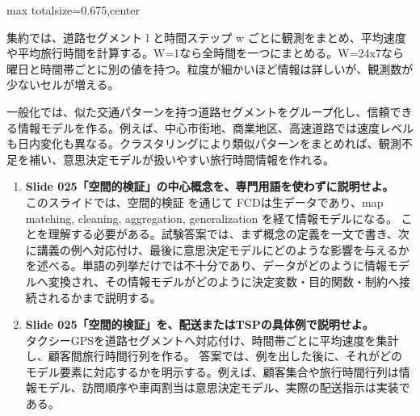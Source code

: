 \begin{adjustbox}{max totalsize={\textwidth}{0.675\textheight},center}
\begin{minipage}{\textwidth}
\begin{minipage}[t]{0.485\textwidth}
集約では、道路セグメント l と時間ステップ w ごとに観測をまとめ、平均速度や平均旅行時間を計算する。W=1なら全時間を一つにまとめる。W=24x7なら曜日と時間帯ごとに別の値を持つ。粒度が細かいほど情報は詳しいが、観測数が少ないセルが増える。\par
一般化では、似た交通パターンを持つ道路セグメントをグループ化し、信頼できる情報モデルを作る。例えば、中心市街地、商業地区、高速道路では速度レベルも日内変化も異なる。クラスタリングにより類似パターンをまとめれば、観測不足を補い、意思決定モデルが扱いやすい旅行時間情報を作れる。\par
{}
\begin{enumerate}
\item \textbf{Slide 025「空間的検証」の中心概念を、専門用語を使わずに説明せよ。}\\このスライドでは、空間的検証 を通じて FCDは生データであり、map matching, cleaning, aggregation, generalization を経て情報モデルになる。 ことを理解する必要がある。試験答案では、まず概念の定義を一文で書き、次に講義の例へ対応付け、最後に意思決定モデルにどのような影響を与えるかを述べる。単語の列挙だけでは不十分であり、データがどのように情報モデルへ変換され、その情報モデルがどのように決定変数・目的関数・制約へ接続されるかまで説明する。
\item \textbf{Slide 025「空間的検証」を、配送またはTSPの具体例で説明せよ。}\\タクシーGPSを道路セグメントへ対応付け、時間帯ごとに平均速度を集計し、顧客間旅行時間行列を作る。 答案では、例を出した後に、それがどのモデル要素に対応するかを明示する。例えば、顧客集合や旅行時間行列は情報モデル、訪問順序や車両割当は意思決定モデル、実際の配送指示は実装である。
\end{enumerate}
\end{minipage}
\end{minipage}
\end{adjustbox}


